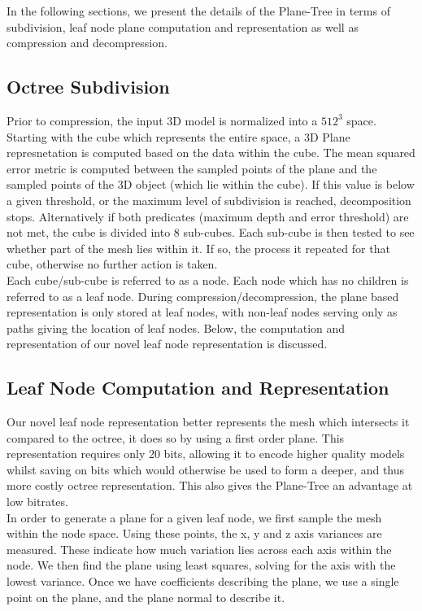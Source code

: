 
In the following sections, we present the details of the Plane-Tree in terms of subdivision, leaf node plane computation and representation as well as compression and decompression. \\


\subsection{Octree Subdivision}

Prior to compression, the input 3D model is normalized into a $512^3$ space. Starting with the cube which represents the entire space, a 3D Plane represnetation is computed based on the data within the cube. The mean squared error metric is computed between the sampled points of the plane and the sampled points of the 3D object (which lie within the cube). If this value is below a given threshold, or the maximum level of subdivision is reached, decomposition stops. Alternatively if both predicates (maximum depth and error threshold) are not met, the cube is divided into 8 sub-cubes. Each sub-cube is then tested to see whether part of the mesh lies within it. If so, the process it repeated for that cube, otherwise no further action is taken. \\

Each cube/sub-cube is referred to as a node. Each node which has no children is referred to as a leaf node. During compression/decompression, the plane based representation is only stored at leaf nodes, with non-leaf nodes serving only as paths giving the location of leaf nodes. Below, the computation and representation of our novel leaf node representation is discussed. \\

\subsection{Leaf Node Computation and Representation}
\label{NRep}

Our novel leaf node representation better represents the mesh which intersects it compared to the octree, it does so by using a first order plane. This representation requires only 20 bits, allowing it to encode higher quality models whilst saving on bits which would otherwise be used to form a deeper, and thus more costly octree representation. This also gives the Plane-Tree an advantage at low bitrates. \\

In order to generate a plane for a given leaf node, we first sample the mesh within the node space. Using these points, the x, y and z axis variances are measured. These indicate how much variation lies across each axis within the node. We then find the plane using least squares, solving for the axis with the lowest variance. Once we have coefficients describing the plane, we use a single point on the plane, and the plane normal to describe it. \\

